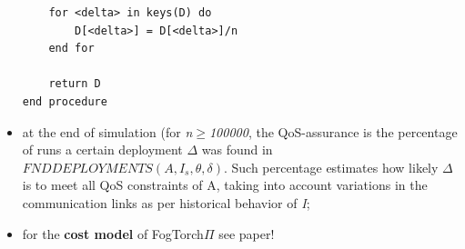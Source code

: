 \documentclass[oneside]{article}
\begin{document}
\begin{itemize}
\begin{verbatim}
	for <delta> in keys(D) do
		D[<delta>] = D[<delta>]/n
	end for
	
	return D
end procedure
    \end{verbatim}
    
    \item at the end of simulation (for \textit{n$\geq$100000}, the QoS-assurance is the percentage of runs a certain deployment $\Delta$ was found in $FNDDEPLOYMENTS (A, I_s, \theta, \delta)$. Such percentage estimates how likely $\Delta$ is to meet all QoS constraints of A, taking into account variations in the communication links as per historical behavior of \textit{I};
    
    \item for the \textbf{cost model} of FogTorch$\Pi$ see paper!
\end{itemize}

\newpage
\end{document}
